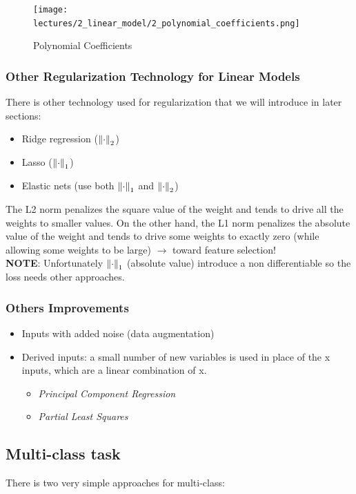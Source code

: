 \documentclass[../main.tex]{subfiles}
\begin{document}
\begin{figure}[H]
    \centering
    \texttt{[image: lectures/2\_linear\_model/2\_polynomial\_coefficients.png]}
    \caption{Polynomial Coefficients}
    \label{fig:2_poly_coeff_with_reg}
\end{figure}


\subsubsection{Other Regularization Technology for Linear Models}
There is other technology used for regularization that we will introduce in later sections:
\begin{itemize}
    \item Ridge regression ($\left\lVert\cdot\right\rVert_2$)
    \item Lasso ($\left\lVert\cdot\right\rVert_1$)
    \item Elastic nets (use both $\left\lVert\cdot\right\rVert_1$ and $\left\lVert\cdot\right\rVert_2$)
\end{itemize}

The L2 norm penalizes the square value of the weight and tends to drive all the weights to smaller values. On the other hand, the L1 norm penalizes the absolute value of the weight and tends to drive some weights to exactly zero (while allowing some weights to be large) $\rightarrow$ toward feature selection!\\

\textbf{NOTE}: Unfortunately $\left\lVert\cdot\right\rVert_1$ (absolute value) introduce a non differentiable so the loss needs other approaches.

\subsubsection{Others Improvements}
\begin{itemize}
    \item Inputs with added noise (data augmentation)
    \item Derived inputs: a small number of new variables is used in place of the x inputs, which are a linear combination of x.
    \begin{itemize}
        \item \textit{Principal Component Regression}
        \item \textit{Partial Least Squares}
    \end{itemize}
\end{itemize}

\subsection{Multi-class task}
There is two very simple approaches for multi-class:
\end{document}
